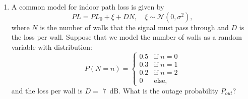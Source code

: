 \documentclass[11pt]{article}
\begin{document}
\begin{enumerate}
\begin{enumerate}[label=(\alph*)]
\item A common model for indoor path loss is given by
\[
    PL = PL_0 + \xi + DN, \quad \xi \sim {\mathcal N}(0,\sigma^2),
\]
where $N$ is the number of walls that the signal must pass through
and $D$ is the loss per wall.  Suppose that we model the number of
walls as a random variable with distribution:
\[
    P(N=n) = \begin{cases}
        0.5 & \mbox{if } n=0 \\
        0.3 & \mbox{if } n=1 \\
        0.2 & \mbox{if } n=2 \\
        0 & \mbox{else, }
        \end{cases}
\]
and the loss per wall is $D=$ 7~dB.
What is the outage probability $P_{out}$?
\end{enumerate}

\end{enumerate}
\end{document}
